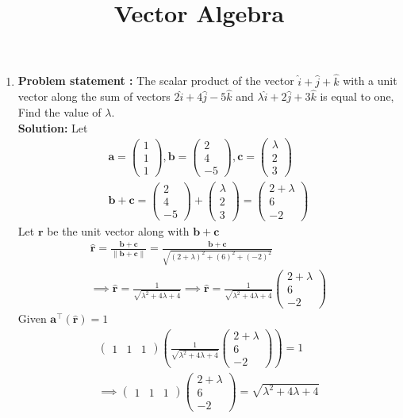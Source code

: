 \documentclass[10pt]{article}
\providecommand{\brak}[1]{\ensuremath{\left(#1\right)}}
\newcommand{\solution}{\noindent \textbf{Solution: }}
\newcommand{\myvec}[1]{\ensuremath{\begin{pmatrix}#1\end{pmatrix}}}
\providecommand{\norm}[1]{\left\lVert#1\right\rVert}
\let\vec\mathbf{}
\begin{document}
\begin{center}
\title{\textbf{Vector Algebra}}
\date{\vspace{-5ex}} %
\maketitle
\end{center}

\begin{enumerate}
\item\textbf{Problem statement :} The scalar product of the vector $\hat{i}+\hat{j}+\hat{k}$ with a unit vector along the sum of vectors $2\hat{i}+4\hat{j}-5\hat{k}$ and $\lambda\hat{i}+2\hat{j}+3\hat{k}$ is equal to one, Find the value of $\lambda$.
\\
\solution
Let
\begin{align}
\vec{a} =\myvec{1\\1\\1} , \vec{b}=\myvec{2\\4\\-5} , \vec{c}=\myvec{\lambda\\2\\3}\\
\vec{b}+\vec{c}=\myvec{2\\4\\-5}+\myvec{\lambda\\2\\3}=\myvec{2+\lambda\\6\\-2}
\end{align}
Let $\vec{r}$ be the unit vector along with $\vec{b}+\vec{c}$
\begin{align}
\hat{\vec{r}}=\frac{\vec{b}+\vec{c}}{\norm{\vec{b}+\vec{c}}}=\frac{\vec{b}+\vec{c}}{\sqrt{\brak{2+\lambda}^2+\brak{6}^2+\brak{-2}^2}}\\
\implies\hat{\vec{r}}=\frac{1}{\sqrt{\lambda^2+4\lambda+4}}
\implies\hat{\vec{r}}=\frac{1}{\sqrt{\lambda^2+4\lambda+4}}\myvec{2+\lambda\\6\\-2}
\end{align}
Given $\vec{a}^\top\brak{\vec{\hat{r}}} = 1$
\begin{align}
	\myvec{1&1&1}\brak{\frac{1}{
		{\sqrt{\lambda^2+4\lambda+4}}}\myvec{2+\lambda\\6\\-2}}=1\\
\implies \myvec{1&1&1}\myvec{2+\lambda\\6\\-2}={\sqrt{\lambda^2+4\lambda+4}}\\

\end{align}
\end{enumerate}
\end{document}
